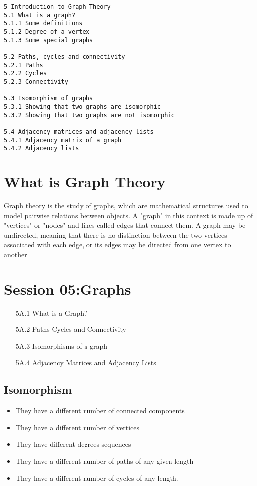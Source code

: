 \documentclass[]{report}
\begin{document}
\begin{verbatim}
5 Introduction to Graph Theory 
5.1 What is a graph?
5.1.1 Some definitions  
5.1.2 Degree of a vertex 
5.1.3 Some special graphs  

5.2 Paths, cycles and connectivity  
5.2.1 Paths 
5.2.2 Cycles  
5.2.3 Connectivity  

5.3 Isomorphism of graphs  
5.3.1 Showing that two graphs are isomorphic 
5.3.2 Showing that two graphs are not isomorphic
 
5.4 Adjacency matrices and adjacency lists  
5.4.1 Adjacency matrix of a graph 
5.4.2 Adjacency lists 

\end{verbatim}

\section*{What is Graph Theory}
Graph theory is the study of graphs, which are mathematical structures used to model pairwise relations between objects. A "graph" in this context is made up of "vertices" or "nodes" and lines called edges that connect them. A graph may be undirected, meaning that there is no distinction between the two vertices associated with each edge, or its edges may be directed from one vertex to another

\section*{Session 05:Graphs}
\begin{itemize}
\item[5A.1] What is a Graph?
\item[5A.2] Paths Cycles and Connectivity
\item[5A.3] Isomorphisms of a graph
\item[5A.4] Adjacency Matrices and Adjacency Lists
\end{itemize}



\subsection*{Isomorphism}
\begin{itemize}
\item They have a different number of connected components
\item They have a different number of vertices
\item They have different degrees sequences
\item They have a different number of paths of any given length
\item They have a different number of cycles of any length.
\end{itemize}
\end{document}
